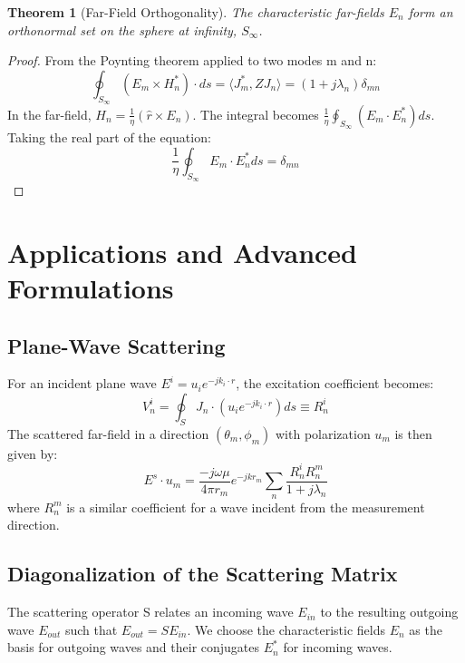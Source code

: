 \documentclass[11pt,a4paper]{article}
\newcommand{\avg}[1]{\langle #1 \rangle} %
\newtheorem{theorem}{Theorem}[section]
\begin{document}
\begin{theorem}[Far-Field Orthogonality]
The characteristic far-fields \(E_{n}\) form an orthonormal set on the sphere at infinity, \(S_{\infty}\).
\end{theorem}
\begin{proof}
From the Poynting theorem applied to two modes m and n:
\begin{equation}
    \oint_{S_{\infty}}(E_{m}\times H_{n}^{*})\cdot ds=\avg{ J_{m}^{*},ZJ_{n}}=(1+j\lambda_{n})\delta_{mn}
\end{equation}
In the far-field, \(H_{n}=\frac{1}{\eta}(\hat{r}\times E_{n})\). The integral becomes \(\frac{1}{\eta}\oint_{S_{\infty}}(E_{m}\cdot E_{n}^{*})ds\). Taking the real part of the equation:
\begin{equation}
    \frac{1}{\eta}\oint_{S_{\infty}}E_{m}\cdot E_{n}^{*}ds=\delta_{mn}
\end{equation}
\end{proof}

\section{Applications and Advanced Formulations}
\subsection{Plane-Wave Scattering}

For an incident plane wave \(E^{i}=u_{i}e^{-jk_{i}\cdot r}\), the excitation coefficient becomes:
\begin{equation}
    V_{n}^{i}=\oint_{S}J_{n}\cdot(u_{i}e^{-jk_{i}\cdot r})ds\equiv R_{n}^{i}
\end{equation}
The scattered far-field in a direction \((\theta_{m},\phi_{m})\) with polarization \(u_{m}\) is then given by:
\begin{equation}
    E^{s}\cdot u_{m}=\frac{-j\omega\mu}{4\pi r_{m}}e^{-jkr_{m}}\sum_{n}\frac{R_{n}^{i}R_{n}^{m}}{1+j\lambda_{n}}
\end{equation}
where \(R_{n}^{m}\) is a similar coefficient for a wave incident from the measurement direction.

\subsection{Diagonalization of the Scattering Matrix}

The scattering operator S relates an incoming wave \(E_{in}\) to the resulting outgoing wave \(E_{out}\) such that \(E_{out}=SE_{in}\). We choose the characteristic fields \(E_{n}\) as the basis for outgoing waves and their conjugates \(E_{n}^{*}\) for incoming waves.
\end{document}
